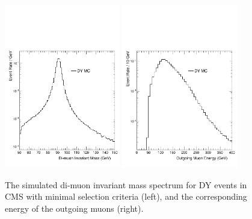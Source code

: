\begin{figure}[ht]
	\centering
	\includegraphics[width=0.45\textwidth]{figures/dyMuSpectrum.pdf}
	\hspace{0.01\textwidth}
	\includegraphics[width=0.45\textwidth]{figures/dyMuEnergy.pdf}
	\caption[DY Process Di-muon Invariant Mass and Outgoing Muon Energy]{The simulated di-muon invariant mass spectrum for DY events in CMS with minimal selection criteria (left), and the corresponding energy of the outgoing muons (right).}
	\label{fig:dySpectrum}
\end{figure}


